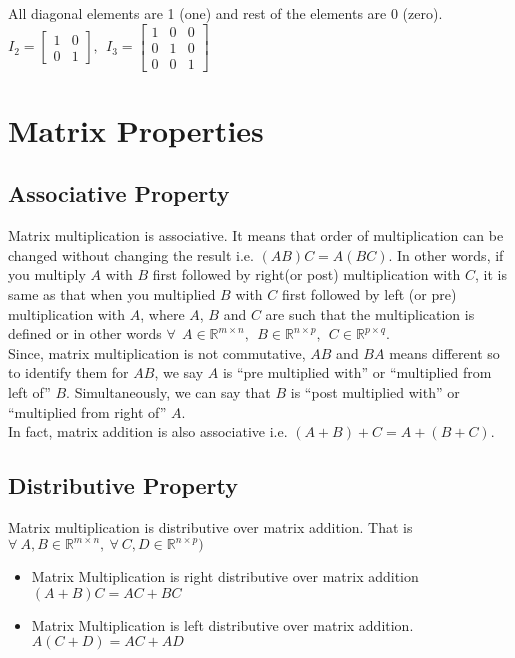 \documentclass{article}
\begin{document}
All diagonal elements are 1 (one) and rest of the elements are 0 (zero).\\
\begin{math}
I_2 = \begin{bmatrix}
            1 & 0 \\
            0 & 1
         \end{bmatrix},~~ I_3 = 
         \begin{bmatrix}
            1 & 0 & 0 \\
            0 & 1 & 0 \\
            0 & 0 & 1
         \end{bmatrix}
\end{math}

\section{Matrix Properties}
\subsection{Associative Property}
Matrix multiplication is associative. It means that order of multiplication can be changed without changing the result i.e. \((AB)C = A(BC)\). In other words, if you multiply \(A\) with \(B\) first followed by right(or post) multiplication with \(C\), it is same as that when you multiplied \(B\) with \(C\) first followed by left (or pre) multiplication with \(A\), where \(A\), \(B\) and \(C\) are such that the multiplication is defined or in other words \( \forall~~ A \in \mathbb{R} ^{m\times n} ,~~ B \in \mathbb{R} ^{n\times p} ,~~ C \in \mathbb{R} ^{p\times q} \).\\

Since, matrix multiplication is not commutative, \(AB\) and \(BA\) means different so to identify them for \(AB\), we say \(A\) is ``pre multiplied with'' or ``multiplied from left of'' \(B\). Simultaneously, we can say that \(B\) is ``post multiplied with'' or ``multiplied from right of'' \(A\).\\

In fact, matrix addition is also associative i.e. \((A+B)+C = A+(B+C)\).

\subsection{Distributive Property}
Matrix multiplication is distributive over matrix addition. That is \( \forall ~ A, B \in \mathbb{R} ^{m\times n}, ~\forall~C,D\in \mathbb{R} ^{n\times p})\)
\begin{itemize}
    \item Matrix Multiplication is right distributive over matrix addition\\
\( (A + B)C = AC + BC \)
    \item Matrix Multiplication is left distributive over matrix addition.\\
    \(A(C + D) = AC + AD \)
\end{itemize}
\end{document}
